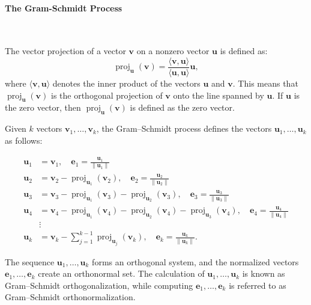 \documentclass[11pt,twoside,a4paper]{article}
\begin{document}
\paragraph{The Gram-Schmidt Process} \ \

The vector projection of a vector $\mathbf{v}$ on a nonzero vector $\mathbf{u}$ is defined as:
\[
\operatorname{proj}_{\mathbf{u}}(\mathbf{v}) = \frac{\langle \mathbf{v}, \mathbf{u} \rangle}{\langle \mathbf{u}, \mathbf{u} \rangle} \mathbf{u},
\]
where $\langle \mathbf{v}, \mathbf{u} \rangle$ denotes the inner product of the vectors $\mathbf{u}$ and $\mathbf{v}$. This means that $\operatorname{proj}_{\mathbf{u}}(\mathbf{v})$ is the orthogonal projection of $\mathbf{v}$ onto the line spanned by $\mathbf{u}$. If $\mathbf{u}$ is the zero vector, then $\operatorname{proj}_{\mathbf{u}}(\mathbf{v})$ is defined as the zero vector.

Given $k$ vectors $\mathbf{v}_1, \dots, \mathbf{v}_k$, the Gram--Schmidt process defines the vectors $\mathbf{u}_1, \dots, \mathbf{u}_k$ as follows:

\begin{align*}
\mathbf{u}_1 &= \mathbf{v}_1, \quad \mathbf{e}_1 = \frac{\mathbf{u}_1}{\|\mathbf{u}_1\|} \\
\mathbf{u}_2 &= \mathbf{v}_2 - \operatorname{proj}_{\mathbf{u}_1}(\mathbf{v}_2), \quad \mathbf{e}_2 = \frac{\mathbf{u}_2}{\|\mathbf{u}_2\|} \\
\mathbf{u}_3 &= \mathbf{v}_3 - \operatorname{proj}_{\mathbf{u}_1}(\mathbf{v}_3) - \operatorname{proj}_{\mathbf{u}_2}(\mathbf{v}_3), \quad \mathbf{e}_3 = \frac{\mathbf{u}_3}{\|\mathbf{u}_3\|} \\
\mathbf{u}_4 &= \mathbf{v}_4 - \operatorname{proj}_{\mathbf{u}_1}(\mathbf{v}_4) - \operatorname{proj}_{\mathbf{u}_2}(\mathbf{v}_4) - \operatorname{proj}_{\mathbf{u}_3}(\mathbf{v}_4), \quad \mathbf{e}_4 = \frac{\mathbf{u}_4}{\|\mathbf{u}_4\|} \\
& \vdots \\
\mathbf{u}_k &= \mathbf{v}_k - \sum_{j=1}^{k-1} \operatorname{proj}_{\mathbf{u}_j}(\mathbf{v}_k), \quad \mathbf{e}_k = \frac{\mathbf{u}_k}{\|\mathbf{u}_k\|}.
\end{align*}

The sequence $\mathbf{u}_1, \dots, \mathbf{u}_k$ forms an orthogonal system, and the normalized vectors $\mathbf{e}_1, \dots, \mathbf{e}_k$ create an orthonormal set. The calculation of $\mathbf{u}_1, \dots, \mathbf{u}_k$ is known as Gram--Schmidt orthogonalization, while computing $\mathbf{e}_1, \dots, \mathbf{e}_k$ is referred to as Gram--Schmidt orthonormalization.
\end{document}
